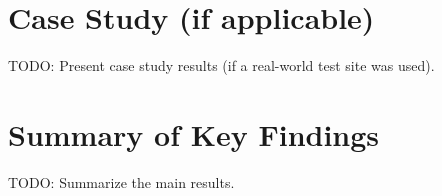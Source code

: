 \section{Case Study (if applicable)}
TODO: Present case study results (if a real-world test site was used).

\section{Summary of Key Findings}
TODO: Summarize the main results.

